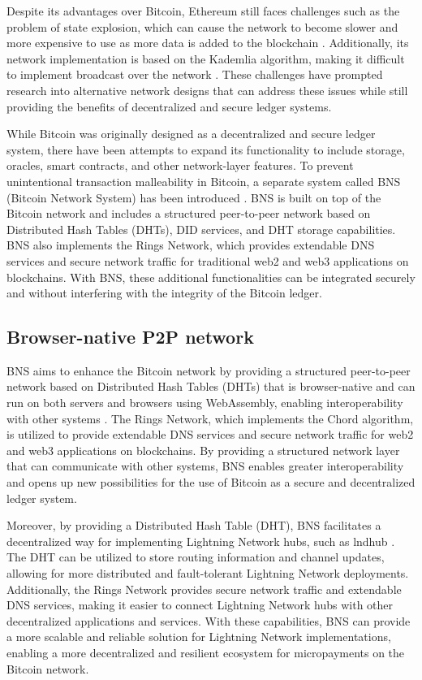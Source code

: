 \documentclass[twocolumn]{article}
\begin{document}
Despite its advantages over Bitcoin, Ethereum still faces challenges such as the problem of state explosion, which can cause the network to become slower and more expensive to use as more data is added to the blockchain \cite{wood2014ethereum}. Additionally, its network implementation is based on the Kademlia algorithm, making it difficult to implement broadcast over the network \cite{gervais2016security}. These challenges have prompted research into alternative network designs that can address these issues while still providing the benefits of decentralized and secure ledger systems.

While Bitcoin was originally designed as a decentralized and secure ledger system, there have been attempts to expand its functionality to include storage, oracles, smart contracts, and other network-layer features. To prevent unintentional transaction malleability in Bitcoin, a separate system called BNS (Bitcoin Network System) has been introduced \cite{BNS-tech}. BNS is built on top of the Bitcoin network and includes a structured peer-to-peer network based on Distributed Hash Tables (DHTs), DID services, and DHT storage capabilities. BNS also implements the Rings Network, which provides extendable DNS services and secure network traffic for traditional web2 and web3 applications on blockchains. With BNS, these additional functionalities can be integrated securely and without interfering with the integrity of the Bitcoin ledger.
\subsection{Browser-native P2P network}

BNS aims to enhance the Bitcoin network by providing a structured peer-to-peer network based on Distributed Hash Tables (DHTs) that is browser-native and can run on both servers and browsers using WebAssembly, enabling interoperability with other systems \cite{BNS-tech}. The Rings Network, which implements the Chord algorithm, is utilized to provide extendable DNS services and secure network traffic for web2 and web3 applications on blockchains. By providing a structured network layer that can communicate with other systems, BNS enables greater interoperability and opens up new possibilities for the use of Bitcoin as a secure and decentralized ledger system.

Moreover, by providing a Distributed Hash Table (DHT), BNS facilitates a decentralized way for implementing Lightning Network hubs, such as lndhub \cite{BNS-usecases}. The DHT can be utilized to store routing information and channel updates, allowing for more distributed and fault-tolerant Lightning Network deployments. Additionally, the Rings Network provides secure network traffic and extendable DNS services, making it easier to connect Lightning Network hubs with other decentralized applications and services. With these capabilities, BNS can provide a more scalable and reliable solution for Lightning Network implementations, enabling a more decentralized and resilient ecosystem for micropayments on the Bitcoin network.
\end{document}
